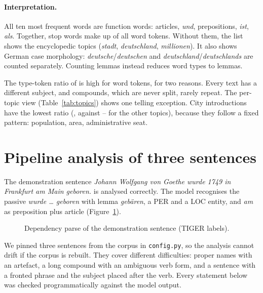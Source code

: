 \documentclass[11pt,a4paper]{article}
\newcommand{\code}[1]{\texttt{#1}}
\newcommand{\de}[1]{\textit{#1}}
\begin{document}
\paragraph{Interpretation.} All ten most frequent words are function words: articles, \de{und}, prepositions, \de{ist}, \de{als}. Together, stop words make up \StopShare{} of all word tokens. Without them, the list shows the encyclopedic topics (\de{stadt}, \de{deutschland}, \de{millionen}). It also shows German case morphology: \de{deutsche}/\de{deutschen} and \de{deutschland}/\de{deutschlands} are counted separately. Counting lemmas instead reduces \NUnique{} word types to \NLemmas{} lemmas.

The type-token ratio of \TTR{} is high for \NWordTokens{} word tokens, for two reasons. Every text has a different subject, and compounds, which are never split, rarely repeat. The per-topic view (Table~\ref{tab:topics}) shows one telling exception. City introductions have the lowest ratio (\TTRCity, against \TTROtherMin--\TTROtherMax{} for the other topics), because they follow a fixed pattern: population, area, administrative seat.

\begin{table}[h]\centering\small
\caption{Statistics per topic.}\label{tab:topics}

\end{table}

\section{Pipeline analysis of three sentences}\label{sec:sentences}
The demonstration sentence \de{Johann Wolfgang von Goethe wurde 1749 in Frankfurt am Main geboren.} is analysed correctly. The model recognises the passive \de{wurde … geboren} with lemma \de{gebären}, a PER and a LOC entity, and \de{am} as preposition plus article (Figure~\ref{fig:demo}).

\begin{figure}[h]\centering

\caption{Dependency parse of the demonstration sentence (TIGER labels).}\label{fig:demo}
\end{figure}

We pinned three sentences from the corpus in \code{config.py}, so the analysis cannot drift if the corpus is rebuilt. They cover different difficulties: proper names with an artefact, a long compound with an ambiguous verb form, and a sentence with a fronted phrase and the subject placed after the verb. Every statement below was checked programmatically against the model output.
\end{document}
